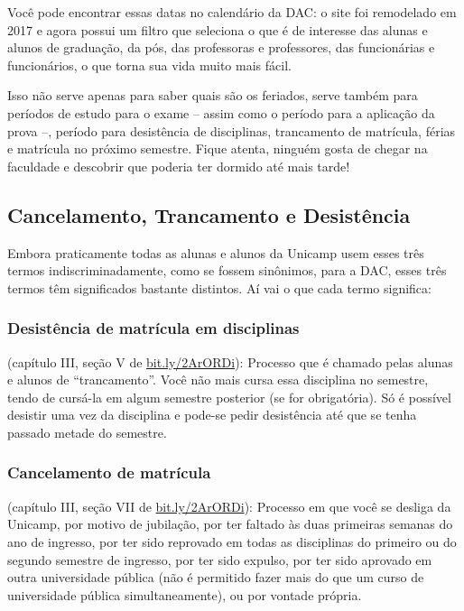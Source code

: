 Você pode encontrar essas datas no calendário da DAC: o site foi remodelado em
2017 e agora possui um filtro que seleciona o que é de interesse das alunas e
alunos de graduação, da pós, das professoras e professores, das funcionárias e
funcionários, o que torna sua vida muito mais fácil.

Isso não serve apenas para saber quais são os feriados, serve também para
períodos de estudo para o exame -- assim como o período para a aplicação da
prova --, período para desistência de disciplinas, trancamento de matrícula,
férias e matrícula no próximo semestre. Fique atenta, ninguém gosta de chegar
na faculdade e descobrir que poderia ter dormido até mais tarde!

\subsection{Cancelamento, Trancamento e Desistência}

Embora praticamente todas as alunas e alunos da Unicamp usem esses três termos
indiscriminadamente, como se fossem sinônimos, para a DAC, esses três termos
têm significados bastante distintos. Aí vai o que cada termo significa:

\subsubsection{Desistência de matrícula em disciplinas} (capítulo III, seção V
de \url{bit.ly/2ArORDi}): Processo que é chamado pelas alunas e alunos de
``trancamento''. Você não mais cursa essa disciplina no semestre, tendo de
cursá-la em algum semestre posterior (se for obrigatória). Só é possível
desistir uma vez da disciplina e pode-se pedir desistência até que se tenha
passado metade do semestre.
\subsubsection{Cancelamento de matrícula} (capítulo III, seção VII de
\url{bit.ly/2ArORDi}): Processo em que você se desliga da Unicamp, por motivo
de jubilação, por ter faltado às duas primeiras semanas do ano de ingresso, por
ter sido reprovado em todas as disciplinas do primeiro ou do segundo semestre
de ingresso, por ter sido expulso, por ter sido aprovado em outra universidade
pública (não é permitido fazer mais do que um curso de universidade pública
simultaneamente), ou por vontade própria.
